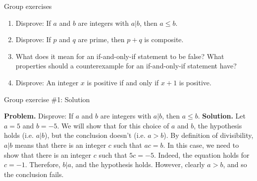 \documentclass[10pt]{beamer}
\begin{document}
\begin{frame}{Group exercises}
\begin{enumerate}
	\item Disprove: If $a$ and $b$ are integers with $a|b$, then $a \leq b$.
	\item Disprove: If $p$ and $q$ are prime, then $p+q$ is composite.
	\item What does it mean for an if-and-only-if statement to be false? What properties should a counterexample for an if-and-only-if statement have?
	\item Disprove: An integer $x$ is positive if and only if $x+1$ is positive.
\end{enumerate}


\end{frame}



\begin{frame}{Group exercise \#1: Solution}

\textbf{Problem.} Disprove: If $a$ and $b$ are integers with $a|b$, then $a \leq b$.
\vfill 
\pause 
\textbf{Solution.} Let $a=5$ and $b=-5$. We will show that for this choice of $a$ and $b$, the hypothesis holds (i.e. $a|b$), but the conclusion doesn't (i.e. $a>b$).  By definition of divisibility, $a|b$ means that there is an integer $c$ such that $ac =b$. In this case, we need to show that there is an integer $c$ such that  $5c=-5$.  Indeed, the equation holds for $c=-1$.  Therefore, $b|a$, and the hypothesis holds.  However, clearly $a>b$, and so the conclusion fails. 
\end{frame}
\end{document}
